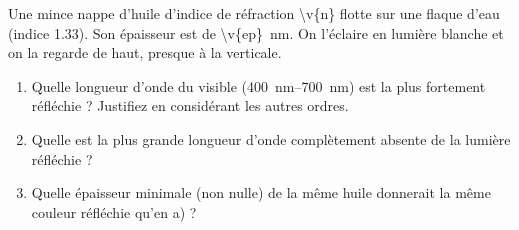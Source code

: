 Une mince nappe d'huile d'indice de réfraction \num{\v{n}} flotte sur une flaque d'eau (indice \num{1.33}). Son épaisseur est de \qty{\v{ep}}{nm}. On l'éclaire en lumière blanche et on la regarde de haut, presque à la verticale.

\begin{enumerate}[label=\alph*)]
    \item Quelle longueur d'onde du visible (\qtyrange{400}{700}{nm}) est la plus fortement réfléchie ? Justifiez en considérant les autres ordres.
    \item Quelle est la plus grande longueur d'onde complètement absente de la lumière réfléchie ?
    \item Quelle épaisseur minimale (non nulle) de la même huile donnerait la même couleur réfléchie qu'en a) ?
\end{enumerate}

